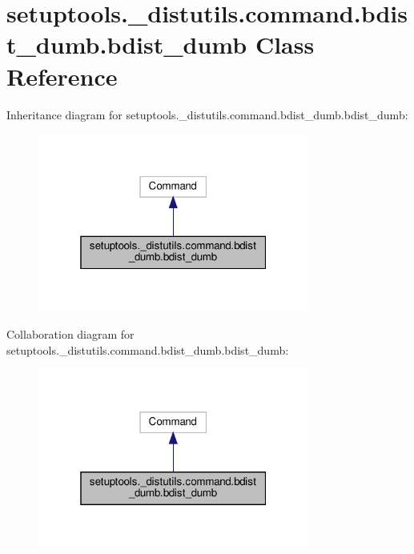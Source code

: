 \hypertarget{classsetuptools_1_1__distutils_1_1command_1_1bdist__dumb_1_1bdist__dumb}{}\section{setuptools.\+\_\+distutils.\+command.\+bdist\+\_\+dumb.\+bdist\+\_\+dumb Class Reference}
\label{classsetuptools_1_1__distutils_1_1command_1_1bdist__dumb_1_1bdist__dumb}


Inheritance diagram for setuptools.\+\_\+distutils.\+command.\+bdist\+\_\+dumb.\+bdist\+\_\+dumb\+:
\nopagebreak
\begin{figure}[H]
\begin{center}
\leavevmode
\includegraphics[width=253pt]{classsetuptools_1_1__distutils_1_1command_1_1bdist__dumb_1_1bdist__dumb__inherit__graph}
\end{center}
\end{figure}


Collaboration diagram for setuptools.\+\_\+distutils.\+command.\+bdist\+\_\+dumb.\+bdist\+\_\+dumb\+:
\nopagebreak
\begin{figure}[H]
\begin{center}
\leavevmode
\includegraphics[width=253pt]{classsetuptools_1_1__distutils_1_1command_1_1bdist__dumb_1_1bdist__dumb__coll__graph}
\end{center}
\end{figure}
